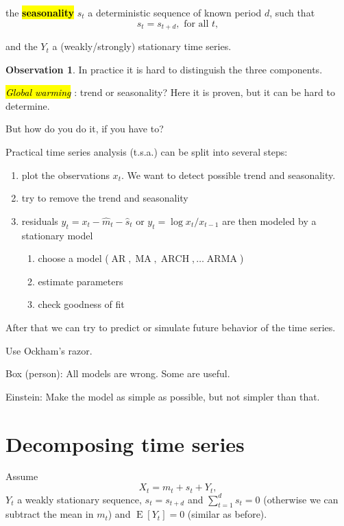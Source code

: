 \documentclass[12pt,a4paper, notitlepage]{book}
\newcommand{\hlc}[2][yellow]{ {\sethlcolor{#1} \hl{#2}} }
\newcommand{\hlcr}[1]{\hlc[lightred]{#1}}
\theoremstyle{definition} %
\newtheorem{observation}[definition]{Observation}
\theoremstyle{plain} %
\DeclareMathOperator{\E}{E}
\DeclareMathOperator{\Arma}{ARMA}
\DeclareMathOperator{\Ar}{AR}
\DeclareMathOperator{\Ma}{MA}
\DeclareMathOperator{\Arch}{ARCH}
\newcommand{\New}[1]{ {\bf \hlcr{#1} } }
\newcommand{\Important}[1]{ {\it \hlc{#1} } }
\begin{document}
the \New{ seasonality} $s_t$ a deterministic sequence of known period $d$, such that 
\[ s_t = s_{t+d} ,  \text{ for all } t , \]

and the $Y_t$ a (weakly/strongly) stationary time series.


\begin{observation}
In practice it is hard to distinguish the three components. 

\Important{Global warming} : trend or seasonality? Here it is proven, but it can be hard to determine.
\end{observation}

But how do you do it, if you have to?

Practical time series analysis (t.s.a.) can be split into several steps:
\begin{enumerate}
\item plot the observations $x_t$. We want to detect possible trend and seasonality. 
\item try to remove the trend and seasonality
\item residuals $y_t = x_t - \hat{m}_t - \hat{s}_t$ or $y_t = \log{x_t / x_{t-1}}$ are then modeled  by a stationary model
\begin{enumerate}
\item choose a model ($\Ar, \Ma, \Arch , \dots \Arma$)
\item estimate parameters
\item check goodness of fit
\end{enumerate}
\end{enumerate}
After that we can try to predict or simulate future behavior of the time series.

Use Ockham's razor.

Box (person): All models are wrong. Some are useful.

Einstein: Make the model as simple as possible, but not simpler than that.

\section{ Decomposing time series}

\vskip1cm


Assume 
\[ X_t = m_t + s_t + Y_t, \]
 $Y_t$ a weakly stationary sequence, $s_t = s_{t+d}$ and $\sum_{t=1}^d s_t = 0$ (otherwise we can subtract the mean in $m_t$) and $ \E [Y_t] = 0$ (similar as before). 
\end{document}
